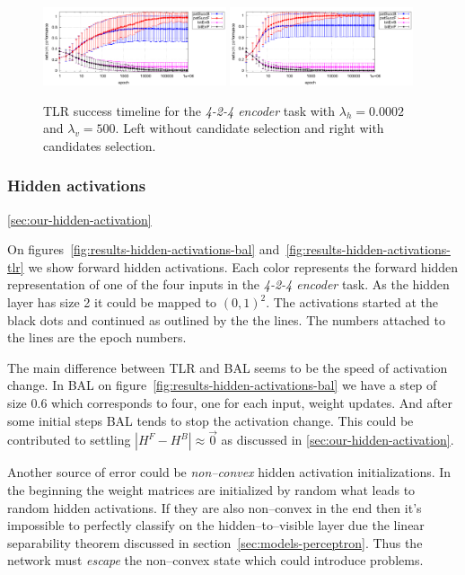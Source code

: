 \begin{figure}[H]
  \centering
  \includegraphics[width=0.48\textwidth]{img/tlr-auto4-best-perf.pdf}   
  \includegraphics[width=0.48\textwidth]{img/tlr-auto4-best-can.pdf}      
  \caption{TLR success timeline for the \emph{4-2-4 encoder} task with $\lambda_h=0.0002$ and $\lambda_v=500$. Left without candidate selection and right with candidates selection.}
  \label{fig:results-tlr-auto4-epoch} 
\end{figure}

\subsubsection{Hidden activations}
\ref{sec:our-hidden-activation}  

On figures~\ref{fig:results-hidden-activations-bal} and~\ref{fig:results-hidden-activations-tlr} we show forward hidden activations. Each color represents the forward hidden representation of one of the four inputs in the \emph{4-2-4 encoder} task. As the hidden layer has size 2 it could be mapped to $(0,1)^2$. The activations started at the black dots and continued as outlined by the the lines. The numbers attached to the lines are the epoch numbers. 

The main difference between TLR and BAL seems to be the speed of activation change. In BAL on figure~\ref{fig:results-hidden-activations-bal} we have a step of size 0.6 which corresponds to four, one for each input, weight updates. And after some initial steps BAL tends to stop the activation change. This could be contributed to settling $|H^F-H^B| \approx \overrightarrow{0}$ as discussed in \ref{sec:our-hidden-activation}. 

Another source of error could be \emph{non--convex} hidden activation initializations. In the beginning the weight matrices are initialized by random what leads to random hidden activations. If they are also non--convex in the end then it's impossible to perfectly classify on the hidden--to--visible layer due the linear separability theorem discussed in section~\ref{sec:models-perceptron}. Thus the network must \emph{escape} the non--convex state which could introduce problems. 

